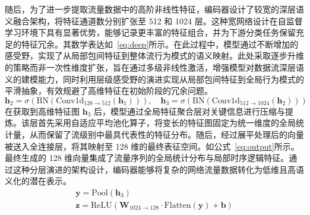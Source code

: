 随后，为了进一步提取流量数据中的高阶非线性特征，编码器设计了较宽的深层语义融合架构，将特征通道数分别扩张至 512 和 1024 层。这种宽网络设计在自监督学习环境下具有显著优势，能够记录更丰富的特征组合，并为下游分类任务保留充足的特征冗余。其数学表达如~\ref{eq:deep}所示。在此过程中，模型通过不断增加的感受野，实现了从局部包间特征到整体流行为模式的语义映射。此处采取逐步升维的策略而非一次性维度扩张，旨在通过多级非线性激活，增强模型对数据流深层语义的建模能力，同时利用层级感受野的演进实现从局部包间特征到全局行为模式的平滑抽象，有效规避了高维特征在初始阶段的冗余问题。
\begin{equation}
  \mathbf{h}_2 = \sigma(\text{BN}(\text{Conv1d}_{128 \to 512}(\mathbf{h}_1))), \quad \mathbf{h}_3 = \sigma(\text{BN}(\text{Conv1d}_{512 \to 1024}(\mathbf{h}_2)))
  \label{eq:deep}
\end{equation}
在获取到高维特征图 $\mathbf{h}_3$ 后，模型通过全局特征聚合层对关键信息进行压缩与提炼。该层首先采用自适应平均池化算子，将变长的特征图固定为统一维度的全局统计量，从而保留了流级别中最具代表性的特征分布。随后，经过展平处理后的向量被送入全连接层，将其映射至 128 维的最终表征空间。如公式~\ref{eq:output}所示。最终生成的 128 维向量集成了流量序列的全局统计分布与局部时序逻辑特征。通过这种分层演进的架构设计，编码器能够将复杂的网络流量数据转化为低维且高语义化的潜在表示。
\begin{equation}
    \begin{gathered}
    \mathbf{y} = \text{Pool}(\mathbf{h}_3) \\
    \mathbf{z} = \text{ReLU}(\mathbf{W}_{1024 \to 128} \cdot \text{Flatten}(\mathbf{y}) + \mathbf{b})
    \end{gathered}
    \label{eq:output}
\end{equation}
